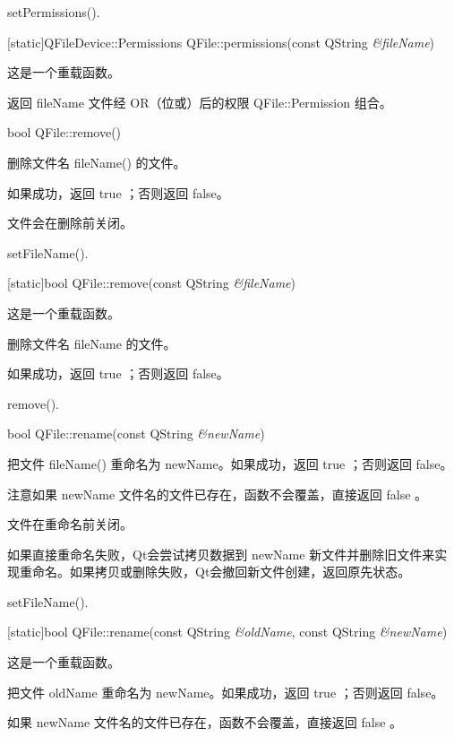 \begin{seeAlso}
setPermissions().
\end{seeAlso}

[static]QFileDevice::Permissions QFile::permissions(const QString \emph{\&fileName})

这是一个重载函数。

返回 fileName 文件经 OR（位或）后的权限 QFile::Permission 组合。

bool QFile::remove()

删除文件名 fileName() 的文件。

如果成功，返回 true ；否则返回 false。

文件会在删除前关闭。

\begin{seeAlso}
setFileName().
\end{seeAlso}

[static]bool QFile::remove(const QString \emph{\&fileName})

这是一个重载函数。

删除文件名 fileName 的文件。

如果成功，返回 true ；否则返回 false。

\begin{seeAlso}
remove().
\end{seeAlso}

bool QFile::rename(const QString \emph{\&newName})

把文件 fileName() 重命名为 newName。如果成功，返回 true ；否则返回 false。

注意如果 newName 文件名的文件已存在，函数不会覆盖，直接返回 false 。

文件在重命名前关闭。

如果直接重命名失败，Qt会尝试拷贝数据到 newName 新文件并删除旧文件来实现重命名。如果拷贝或删除失败，Qt会撤回新文件创建，返回原先状态。



\begin{seeAlso}
setFileName().
\end{seeAlso}

[static]bool QFile::rename(const QString \emph{\&oldName}, const QString \emph{\&newName})

这是一个重载函数。

把文件 oldName 重命名为 newName。如果成功，返回 true ；否则返回 false。


\begin{notice}
如果 newName 文件名的文件已存在，函数不会覆盖，直接返回 false 。
\end{notice}



